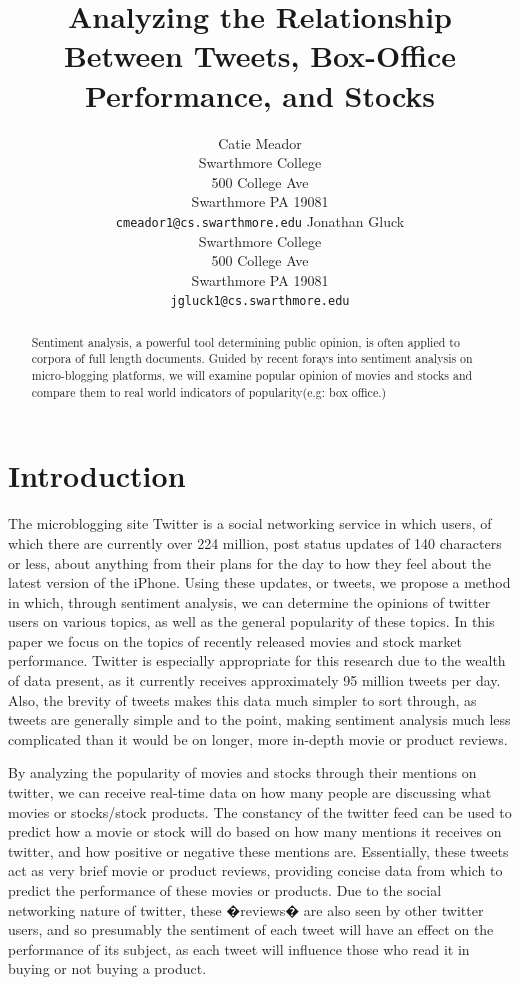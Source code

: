 \documentclass[11pt]{article}
\title{Analyzing the Relationship Between Tweets, Box-Office Performance, and Stocks}
\author{Catie Meador\\
  Swarthmore College\\
  500 College Ave\\
  Swarthmore PA 19081\\
  {\tt cmeador1@cs.swarthmore.edu}  
  \And
  Jonathan Gluck\\
  Swarthmore College\\
  500 College Ave\\
  Swarthmore PA 19081\\
  {\tt jgluck1@cs.swarthmore.edu}  
}
\date{}
\begin{document}
\maketitle

\begin{abstract}
Sentiment analysis, a powerful tool determining public opinion, is often applied to corpora of full length documents. Guided by recent forays into sentiment analysis on micro-blogging platforms, we will examine popular opinion of movies and stocks and compare them to real world indicators of popularity(e.g: box office.)
\end{abstract}

\section{Introduction}

The microblogging site Twitter is a social networking service in which users, of which there are currently over 224 million, post status updates of 140 characters or less, about anything from their plans for the day to how they feel about the latest version of the iPhone.  Using these updates, or tweets, we propose a method in which, through sentiment analysis, we can determine the opinions of twitter users on various topics, as well as the general popularity of these topics.  In this paper we focus on the topics of recently released movies and stock market performance.  Twitter is especially appropriate for this research due to the wealth of data present, as it currently receives approximately 95 million tweets per day.  Also, the brevity of tweets makes this data much simpler to sort through, as tweets are generally simple and to the point, making sentiment analysis much less complicated than it would be on longer, more in-depth movie or product reviews.

By analyzing the popularity of movies and stocks through their mentions on twitter, we can receive real-time data on how many people are discussing what movies or stocks/stock products.  The constancy of the twitter feed can be used to predict how a movie or stock will do based on how many mentions it receives on twitter, and how positive or negative these mentions are.  Essentially, these tweets act as very brief movie or product reviews, providing concise data from which to predict the performance of these movies or products.  Due to the social networking nature of twitter, these �reviews� are also seen by other twitter users, and so presumably the sentiment of each tweet will have an effect on the performance of its subject, as each tweet will influence those who read it in buying or not buying a product.
\end{document}
